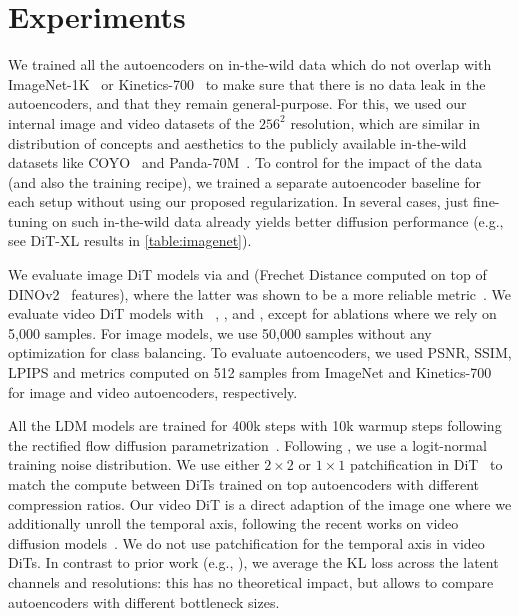 \section{Experiments}
\label{sec:experiments}




We trained all the autoencoders on in-the-wild data which do not overlap with ImageNet-1K~\cite{ImageNet} or Kinetics-700~\cite{kinetics700} to make sure that there is no data leak in the autoencoders, and that they remain general-purpose.
For this, we used our internal image and video datasets of the $256^2$ resolution, which are similar in distribution of concepts and aesthetics to the publicly available in-the-wild datasets like COYO~\cite{COYO} and Panda-70M~\cite{Panda70M}.
To control for the impact of the data (and also the training recipe), we trained a separate autoencoder baseline for each setup without using our proposed regularization.
In several cases, just fine-tuning on such in-the-wild data already yields better diffusion performance (e.g., see DiT-XL results in \cref{table:imagenet}).

We evaluate image DiT models via \fid and \dinofid (Frechet Distance computed on top of DINOv2~\cite{DINOv2} features), where the latter was shown to be a more reliable metric~\cite{DinoFID, EDMv2}.
We evaluate video DiT models with \fvd~\cite{FVD}, \fid, and \dinofid, except for ablations where we rely on 5,000 samples.
For image models, we use 50,000 samples without any optimization for class balancing.
To evaluate autoencoders, we used PSNR, SSIM, LPIPS and \fid metrics computed on 512 samples from ImageNet and Kinetics-700 for image and video autoencoders, respectively.

All the LDM models are trained for 400k steps with 10k warmup steps following the rectified flow diffusion parametrization~\cite{NormFlowsWithStochInterp, LFM, SD3}.
Following \citet{SD3}, we use a logit-normal training noise distribution.
We use either $2 \times 2$ or $1 \times 1$ patchification in DiT~\cite{DiT} to match the compute between DiTs trained on top autoencoders with different compression ratios.
Our video DiT is a direct adaption of the image one where we additionally unroll the temporal axis, following the recent works on video diffusion models~\cite{CogVideoX}.
We do not use patchification for the temporal axis in video DiTs.
In contrast to prior work (e.g., \citet{LDM}), we average the KL loss across the latent channels and resolutions: this has no theoretical impact, but allows to compare autoencoders with different bottleneck sizes.

